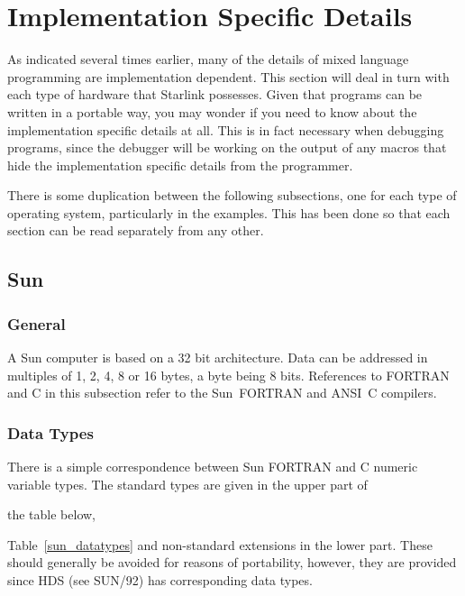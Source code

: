 \documentclass[twoside,11pt]{article}
\newcommand{\latex}[1]{#1}
\newcommand{\xref}[3]{#1}
\newcommand{\xlabel}[1]{}
\renewcommand{\_}{\texttt{\symbol{95}}}
\newcounter{examples}
\begin{document}
\appendix
\newpage

\section{\xlabel{implementation_specific_details}\label{implement}Implementation Specific Details}

As indicated several times earlier, many of the details of mixed language
programming are implementation dependent. This section will deal in turn with
each type of hardware that Starlink possesses. Given that programs can be
written in a portable way, you may wonder if you need to know about the
implementation specific details at all. This is in fact necessary when
debugging programs, since the debugger will be working on the output of any
macros that hide the implementation specific details from the programmer.

There is some duplication between the following subsections, one for each type
of operating system, particularly in the examples. This has been done so that
each section can be read separately from any other.

\subsection{\xlabel{sun}Sun}

\subsubsection{General}

A Sun computer is based on a 32 bit architecture. Data can be addressed in
multiples of 1, 2, 4, 8 or 16 bytes, a byte being 8 bits. References to FORTRAN
and C in this subsection refer to the Sun~FORTRAN and ANSI~C compilers.

\subsubsection{Data Types}

There is a simple correspondence between Sun FORTRAN and C numeric variable 
types.
The standard types are given in the upper part of
\begin{htmlonly}
the table below,
\end{htmlonly} 
\latex{Table~\ref{sun_datatypes}} and
non-standard extensions in the lower part. These should generally be avoided
for reasons of portability, however, they are provided since 
\xref{HDS}{sun92}{} \latex{(see SUN/92)}
has corresponding data types.
\end{document}
